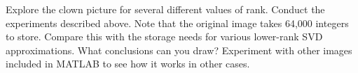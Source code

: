 \begin{problem}
Explore the clown picture for several different values of rank.
Conduct the experiments described above.  Note that the original
image takes 64,000 integers to store.  Compare this with the storage
needs for various lower-rank SVD approximations. What conclusions
can you draw? Experiment with other images included in MATLAB to see how it works in other cases.
\end{problem}

